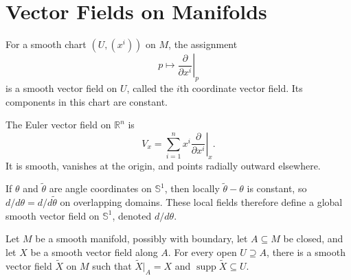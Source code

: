 
\section{Vector Fields on Manifolds}

\begin{example}
\label{ex:8-2}




For a smooth chart $(U,(x^i))$ on $M$, the assignment
\[
p\longmapsto \left.\frac{\partial}{\partial x^i}\right|_p
\]
is a smooth vector field on $U$, called the $i$th coordinate vector field. Its
components in this chart are constant.
\end{example}

\begin{example}
\label{ex:8-3}




The Euler vector field on $\mathbb{R}^n$ is
\[
V_x=\sum_{i=1}^n x^i\left.\frac{\partial}{\partial x^i}\right|_x.
\]
It is smooth, vanishes at the origin, and points radially outward elsewhere.
\end{example}

\begin{example}
\label{ex:8-4}




If $\theta$ and $\widetilde\theta$ are angle coordinates on $\mathbb{S}^1$,
then locally $\widetilde\theta-\theta$ is constant, so
$d/d\theta=d/d\widetilde\theta$ on overlapping domains. These local fields
therefore define a global smooth vector field on $\mathbb{S}^1$, denoted
$d/d\theta$.
\end{example}

\begin{lemma}
\label{lem:8-6}




Let $M$ be a smooth manifold, possibly with boundary, let $A\subseteq M$ be
closed, and let $X$ be a smooth vector field along $A$. For every open
$U\supseteq A$, there is a smooth vector field $\widetilde X$ on $M$ such that
$\widetilde X|_A=X$ and $\operatorname{supp}\widetilde X\subseteq U$.
\end{lemma}

